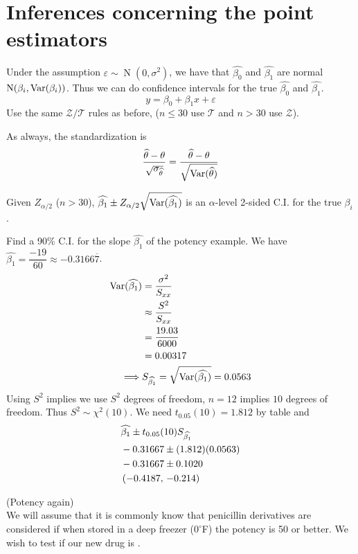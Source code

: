 \section{Inferences concerning the point estimators}

\noindent Under the assumption $\varepsilon \sim \operatorname{N}(0,\sigma^2)$, we have that $\widehat{\beta_0}$ and $\widehat{\beta_1}$ are normal $\operatorname{N}(\beta_i, \Var*{\beta_i})$. Thus we can do confidence intervals for the true $\widehat{\beta_0}$ and $\widehat{\beta_1}$.
$$y = \beta_0 + \beta_1 x + \varepsilon$$
Use the same $\mathcal Z / \mathcal T$ rules as before, ($n \leq 30$ use $\mathcal T$ and $n > 30$ use $\mathcal Z$).

\nl As always, the standardization is 
$$\frac{\that - \theta}{\sqrt{\sigma_{\that}}} = \frac{\that - \theta}{\sqrt{\Var*{\that}}}$$

\example Given $Z_{\alpha/2}$ ($n > 30$), $\widehat{\beta_1} \pm Z_{\alpha/2}\sqrt{\Var*{\widehat{\beta_1}}}$ is an $\alpha$-level 2-sided C.I. for the true $\beta_i$.

\example Find a 90\% C.I. for the slope $\widehat{\beta_1}$ of the potency example. We have $\widehat{\beta_1} = \dfrac{-19}{60} \approx -0.3166\overline{7}$. 
\begin{align*}
    \Var*{\widehat{\beta_1}} &= \frac{\sigma^2}{S_{xx}}\\
    &\approx \frac{S^2}{S_{xx}}\\
    &= \frac{19.03}{6000}\\
    &= 0.00317\\
    \implies & S_{\widehat{\beta_1}} = \sqrt{\Var*{\widehat{\beta_1}}} = 0.0563
\end{align*}
Using $S^2$ implies we use $S^2$ degrees of freedom, $n=12$ implies $10$ degrees of freedom. Thus $S^2 \sim \chi^2(10)$. We need $t_{0.05}(10) = 1.812$ by table and 
\begin{align*}
    & \widehat{\beta_1} \pm t_{0.05}(10)S_{\widehat{\beta_1}}\\
    &- 0.31667 \pm (1.812)(0.0563)\\
    &- 0.31667 \pm 0.1020\\
    & \pars{-0.4187,\, -0.214}
\end{align*}

\example (Potency again)\\
We will assume that it is commonly know that penicillin derivatives are considered  if when stored in a deep freezer ($0^{\circ}$F) the potency is 50 or better. We wish to test if our new drug is .

